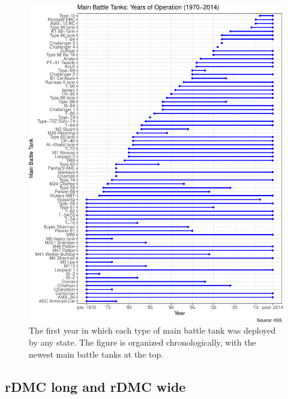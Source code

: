 \documentclass[
]{article}
\begin{document}
\begin{figure}
\centering
\includegraphics{figures/mbt-invention-1.pdf}
\caption{\label{fig:mbt-invention}The first year in which each type of main battle tank was deployed by any state. The figure is organized chronologically, with the newest main battle tanks at the top.}
\end{figure}

\hypertarget{rdmc-long-and-rdmc-wide}{%
\subsection{rDMC long and rDMC wide}\label{rdmc-long-and-rdmc-wide}}
\end{document}
